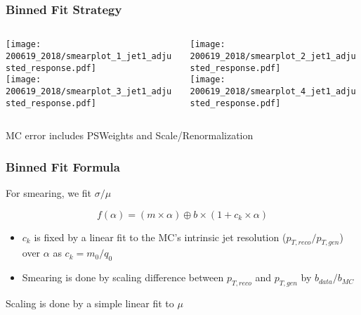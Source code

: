 \documentclass{beamer}
\begin{document}
\begin{frame}
  \frametitle{Binned Fit Strategy}

  \begin{columns}
    \begin{column}{0.3\linewidth}
      \centering
      \texttt{[image: 200619\_2018/smearplot\_1\_jet1\_adjusted\_response.pdf]} \\
      \texttt{[image: 200619\_2018/smearplot\_3\_jet1\_adjusted\_response.pdf]}
    \end{column}
    \begin{column}{0.3\linewidth}
      \centering
      \texttt{[image: 200619\_2018/smearplot\_2\_jet1\_adjusted\_response.pdf]} \\
      \texttt{[image: 200619\_2018/smearplot\_4\_jet1\_adjusted\_response.pdf]}
    \end{column}
  \end{columns}

  \vfill
  MC error includes PSWeights and Scale/Renormalization

\end{frame}


\begin{frame}
  \frametitle{Binned Fit Formula}

  For smearing, we fit $\sigma/\mu$

  \[
  f(\alpha) = (m \times \alpha) \oplus b \times (1 + c_k \times \alpha)
  \]

  \begin{itemize}
  \item $c_k$ is fixed by a linear fit to the MC's intrinsic jet resolution ($p_{T, reco}/p_{T, gen}$) over $\alpha$ as $c_k = m_0/q_0$
  \item Smearing is done by scaling difference between $p_{T,reco}$ and $p_{T,gen}$ by $b_{data}/b_{MC}$
  \end{itemize}

  \vfill

  Scaling is done by a simple linear fit to $\mu$

\end{frame}
\end{document}
